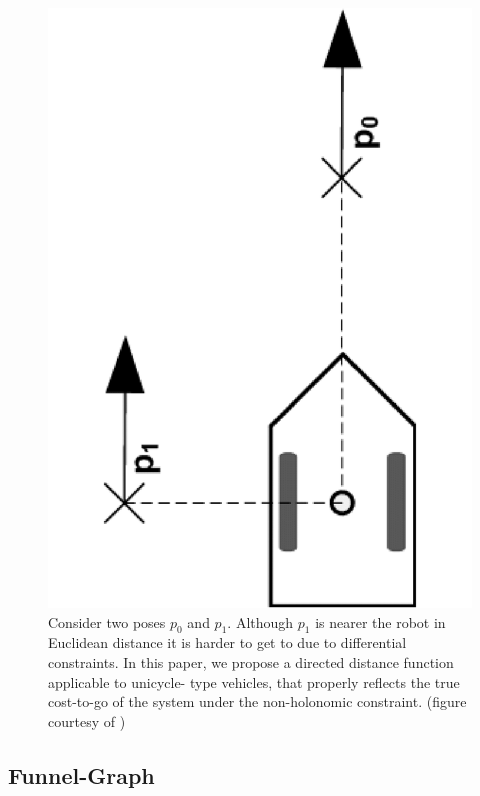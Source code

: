 \begin{figure}
  \centering
  \includegraphics[scale=.2,angle=-90]{figures/rrtfunnel/non-holonomic-vehicle-euclidean-weakness}
  \caption{Consider two poses \(p_0\) and \(p_1\). Although \(p_1\) is nearer
    the robot in Euclidean distance it is harder to get to due to differential
    constraints. In this paper, we propose a directed distance function
    applicable to unicycle- type vehicles, that properly reflects the true
    cost-to-go of the system under the non-holonomic constraint. (figure
    courtesy of \cite{parkFeedbackMotionPlanning2015})}
  \label{fig:non-holonomic-vehicle-euclidean-weakness}
\end{figure}


\subsection{Funnel-Graph}


